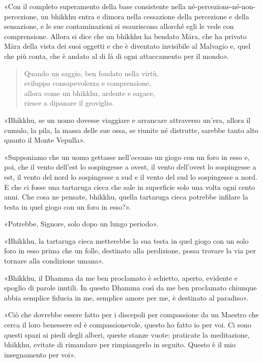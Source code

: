 «Con il completo superamento della base consistente nella
né-percezione-né-non-percezione, un bhikkhu entra e dimora nella cessazione
della percezione e della sensazione, e le sue contaminazioni si esauriscono
allorché egli le vede con comprensione. Allora si dice che un bhikkhu ha bendato
Māra, che ha privato Māra della vista dei suoi oggetti e che è diventato
invisibile al Malvagio e, quel che più conta, che è andato al di là di ogni
attaccamento per il mondo».


\begin{quote}
Quando un saggio, ben fondato nella virtù, \\
sviluppa consapevolezza e comprensione, \\
allora come un bhikkhu, ardente e sagace, \\
riesce a dipanare il groviglio.
\end{quote}


«Bhikkhu, se un uomo dovesse viaggiare e arrancare attraverso un’era, allora il
cumulo, la pila, la massa delle sue ossa, se riunite né distrutte, sarebbe tanto
alto quanto il Monte Vepulla».


«Supponiamo che un uomo gettasse nell’oceano un giogo con un foro in esso e,
poi, che il vento dell’est lo sospingesse a ovest, il vento dell’ovest lo
sospingesse a est, il vento del nord lo sospingesse a sud e il vento del sud lo
sospingesse a nord. E che ci fosse una tartaruga cieca che sale in superficie
solo una volta ogni cento anni. Che cosa ne pensate, bhikkhu, quella tartaruga
cieca potrebbe infilare la testa in quel giogo con un foro in esso?».

«Potrebbe, Signore, solo dopo un lungo periodo».

«Bhikkhu, la tartaruga cieca metterebbe la sua testa in quel giogo con un solo
foro in esso prima che un folle, destinato alla perdizione, possa trovare la via
per tornare alla condizione umana».


«Bhikkhu, il Dhamma da me ben proclamato è schietto, aperto, evidente e spoglio
di parole inutili. In questo Dhamma così da me ben proclamato chiunque abbia
semplice fiducia in me, semplice amore per me, è destinato al paradiso».


«Ciò che dovrebbe essere fatto per i discepoli per compassione da un Maestro che
cerca il loro benessere ed è compassionevole, questo ho fatto io per voi. Ci
sono questi spazi ai piedi degli alberi, queste stanze vuote: praticate la
meditazione, bhikkhu, evitate di rimandare per rimpiangerlo in seguito. Questo è
il mio insegnamento per voi».

